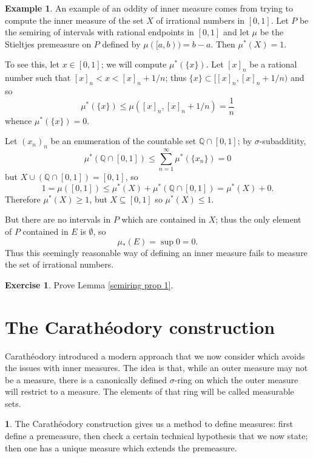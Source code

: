 \documentclass[12pt]{book}
\newcommand{\QQ}{\mathbb{Q}}
\theoremstyle{definition}
\newtheorem{subsec}[theorem]{}
\newtheorem{example}[theorem]{Example}
\newtheorem{exercise}[theorem]{Exercise}
\begin{document}
\begin{example}
An example of an oddity of inner measure comes from trying to compute the inner measure of the set $X$ of irrational numbers in $[0, 1]$.
Let $P$ be the semiring of intervals with rational endpoints in $[0, 1]$ and let $\mu$ be the Stieltjes premeasure on $P$ defined by $\mu([a, b)) = b - a$.
Then $\mu^*(X) = 1$.

To see this, let $x \in [0, 1]$; we will compute $\mu^*(\{x\})$. Let $[x]_n$ be a rational number such that $[x]_n < x < [x]_n + 1/n$; thus $\{x\} \subset [[x]_n, [x]_n + 1/n)$ and so
$$\mu^*(\{x\}) \leq \mu([x]_n, [x]_n + 1/n) = \frac{1}{n}$$
whence $\mu^*(\{x\}) = 0$.

Let $(x_n)_n$ be an enumeration of the countable set $\QQ \cap [0, 1]$; by $\sigma$-subadditity,
$$\mu^*(\QQ \cap [0, 1]) \leq \sum_{n=1}^\infty \mu^*(\{x_n\}) = 0$$
but $X \cup (\QQ \cap [0, 1]) = [0, 1]$, so
$$1 = \mu([0, 1]) \leq \mu^*(X) + \mu^*(\QQ \cap [0, 1]) = \mu^*(X) + 0.$$
Therefore $\mu^*(X) \geq 1$, but $X \subseteq [0, 1]$ so $\mu^*(X) \leq 1$.

But there are no intervals in $P$ which are contained in $X$; thus the only element of $P$ contained in $E$ is $\emptyset$, so
$$\mu_*(E) = \sup 0 = 0.$$
Thus this seemingly reasonable way of defining an inner measure fails to measure the set of irrational numbers.
\end{example}

\begin{exercise}
\label{semiring exercise}
Prove Lemma \ref{semiring prop 1}.
\end{exercise}


\section{The Carathéodory construction}
Carathéodory introduced a modern approach that we now consider which avoids the issues with inner measures.
The idea is that, while an outer measure may not be a measure, there is a canonically defined $\sigma$-ring on which the outer measure will restrict to a measure.
The elements of that ring will be called measurable sets.

\begin{subsec}
The Carathéodory construction gives us a method to define measures: first define a premeasure, then check a certain technical hypothesis that we now state; then one has a unique measure which extends the premeasure.
\end{subsec}
\end{document}
